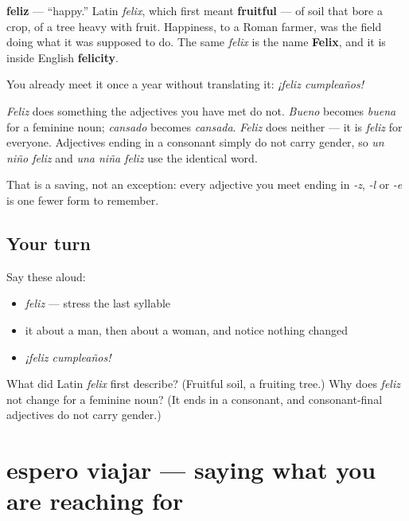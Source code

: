 \begin{cousinweb}
\textbf{feliz} — \textquotedblleft{}happy.\textquotedblright{} Latin \emph{felix}, which first meant \textbf{fruitful} — of soil that bore a crop, of a tree heavy with fruit. Happiness, to a Roman farmer, was the field doing what it was supposed to do. The same \emph{felix} is the name \textbf{Felix}, and it is inside English \textbf{felicity}.

You already meet it once a year without translating it: \emph{¡feliz cumpleaños!}
\end{cousinweb}

\begin{grammarlens}[title={What you've built}]
\emph{Feliz} does something the adjectives you have met do not. \emph{Bueno} becomes \emph{buena} for a feminine noun; \emph{cansado} becomes \emph{cansada}. \emph{Feliz} does neither — it is \emph{feliz} for everyone. Adjectives ending in a consonant simply do not carry gender, so \emph{un niño feliz} and \emph{una niña feliz} use the identical word.

That is a saving, not an exception: every adjective you meet ending in \emph{-z}, \emph{-l} or \emph{-e} is one fewer form to remember.
\end{grammarlens}

\subsection*{Your turn}
Say these aloud:

\begin{itemize}
\raggedright
  \item \emph{feliz} — stress the last syllable
  \item it about a man, then about a woman, and notice nothing changed
  \item \emph{¡feliz cumpleaños!}
\end{itemize}

\begin{tcolorbox}[breakable,colback=teal!4,colframe=teal!35!black,title={Before you move on}]
What did Latin \emph{felix} first describe? (Fruitful soil, a fruiting tree.) Why does \emph{feliz} not change for a feminine noun? (It ends in a consonant, and consonant-final adjectives do not carry gender.)
\end{tcolorbox}
\section[espero viajar]{espero viajar — saying what you are reaching for}

